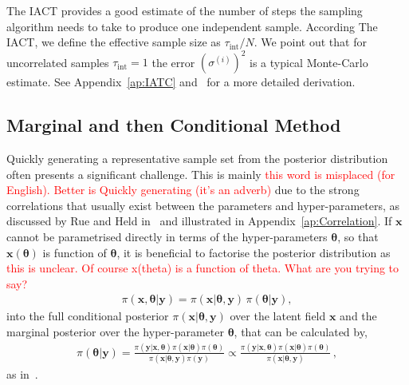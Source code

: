 The IACT provides a good estimate of the number of steps the sampling algorithm needs to take to produce one independent sample.
According The IACT, we define the effective sample size as $ \tau_{\text{int}} /N$.
We point out that for uncorrelated samples $\tau_{\text{int}} = 1$ the error $(\sigma^{(i)})^2$ is a typical Monte-Carlo estimate.
See Appendix~\ref{ap:IATC} and~\cite{Sokal1997, wolff2004monte, wolff2002LecNot} for a more detailed derivation.

\subsection{Marginal and then Conditional Method}
\label{subsec:TheoMTC}
Quickly generating a representative sample set from the posterior distribution often presents a significant challenge. This is mainly \textcolor{red}{this word is misplaced (for English). Better is Quickly generating (it's an adverb)} due to the strong correlations that usually exist between the parameters and hyper-parameters, as discussed by Rue and Held in~\cite{rue2005gaussian} and illustrated in Appendix~\ref{ap:Correlation}.
If $\bm{x}$ cannot be parametrised directly in terms of the hyper-parameters $\bm{\theta}$, so that $\bm{x}(\bm{\theta})$ is function of $\bm{\theta}$, it is beneficial to factorise the posterior distribution as \textcolor{red}{this is unclear. Of course x(theta) is a function of theta. What are you trying to say?}
\begin{align}
	\pi(\bm{x}, \bm{\theta} |  \bm{y}) = \pi(\bm{x} |  \bm{\theta}, \bm{y}) \, \pi(\bm{\theta} |   \bm{y}), \label{eq:MTC}
\end{align}
into the full conditional posterior $\pi(\bm{x} |  \bm{\theta}, \bm{y})$ over the latent field $\bm{x}$ and the marginal posterior over the hyper-parameter $\bm{\theta}$, that can be calculated by,
\begin{align}
	\pi(\bm{\theta} |   \bm{y}) =  \frac{ \pi(   \bm{y} | \bm{x},\bm{\theta})  \pi( \bm{x} | \bm{\theta} )  \pi(\bm{\theta}) }{ \pi(\bm{x} | \bm{\theta} ,   \bm{y})   \pi( \bm{y})} \propto \frac{ \pi(   \bm{y} | \bm{x},\bm{\theta})  \pi( \bm{x} | \bm{\theta} )  \pi(\bm{\theta}) }{ \pi(\bm{x} | \bm{\theta} ,   \bm{y}) } \label{eq:margGen}\, ,
\end{align}
as in~\cite[Lemma 2]{fox2016fast}.

